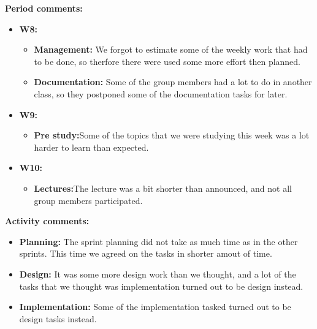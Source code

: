 \textbf{Period comments:}
\begin{itemize}
\item{}\textbf{W8:}
\begin{itemize}
\item{}\textbf{Management:} We forgot to estimate some of the weekly work that had to be done, so therfore there were used some more effort then planned.
\item{}\textbf{Documentation:} Some of the group members had a lot to do in another class, so they postponed some of the documentation tasks for later.
\end{itemize}
\item{}\textbf{W9:}
\begin{itemize}
\item{}\textbf{Pre study:}Some of the topics that we were studying this week was a lot harder to learn than expected.
\end{itemize}
\item{}\textbf{W10:}
\begin{itemize}
\item{}\textbf{Lectures:}The lecture was a bit shorter than announced, and not all group members participated.
\end{itemize}
\end{itemize}

\newpage

\textbf{Activity comments:}
\begin{itemize}
\item{}\textbf{Planning:} The sprint planning did not take as much time as in the other sprints. This time we agreed on the tasks in shorter amout of time.
\item{}\textbf{Design:} It was some more design work than we thought, and a lot of the tasks that we thought was implementation turned out to be design instead.
\item{}\textbf{Implementation:} Some of the implementation tasked turned out to be design tasks instead.
\end{itemize}
